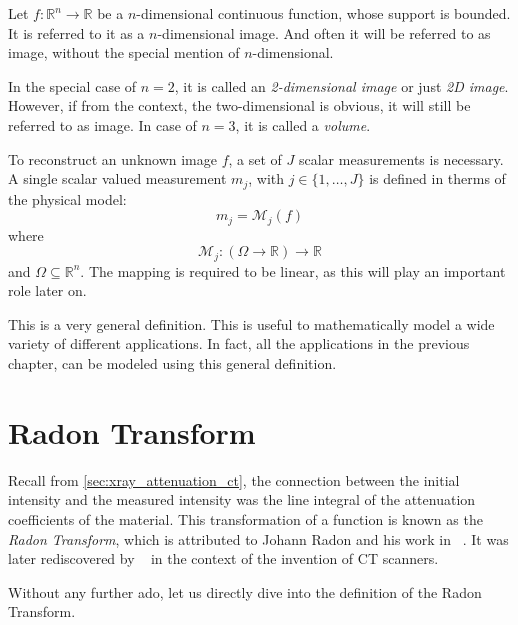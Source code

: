 \begin{definition}[Image]\label{def:image}
	Let \(f\colon \mathbb{R}^n \to \mathbb{R}\) be a \(n\)-dimensional continuous function,
	whose support is bounded. It is referred to it as a \(n\)-dimensional image. And often it will
	be referred to as image, without the special mention of \(n\)-dimensional.
\end{definition}

In the special case of \(n=2\), it is called an \textit{2-dimensional image} or just
\textit{2D image}. However, if from the context, the two-dimensional is obvious, it will still be
referred to as image. In case of \(n=3\), it is called a \textit{volume}.

\begin{definition}\label{def:forward-model}
	To reconstruct an unknown image \(f\), a set of \(J\) scalar measurements is necessary.
	A single scalar valued measurement \(m_j\), with \(j \in \{1, \dots, J\}\) is defined in therms
	of the physical model:
	\[ m_j = \mathscr{M}_j(f)\]
	where
	\[ \mathscr{M}_j\colon (\Omega \to \mathbb{R}) \to \mathbb{R} \]
	and \(\Omega \subseteq \mathbb{R}^n\). The mapping is required to be linear, as this will play an
	important role later on.
\end{definition}

This is a very general definition. This is useful to mathematically model a wide variety of
different applications. In fact, all the applications in the previous chapter, can be modeled using
this general definition.

\section{Radon Transform}\label{sec:radon_transform}

Recall from \autoref{sec:xray_attenuation_ct}, the connection between the initial intensity and the
measured intensity was the line integral of the attenuation coefficients of the material. This
transformation of a function is known as the \textit{Radon Transform}, which is attributed to Johann
Radon and his work in \citeyear{radon_uber_1917}~\cite{radon_uber_1917,radon_determination_1986}. It
was later rediscovered by
\citeauthor{cormack_representation_1963}~\cite{cormack_representation_1963} in the context of the
invention of CT scanners.

Without any further ado, let us directly dive into the definition of the Radon Transform.

